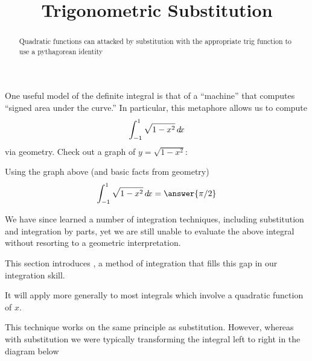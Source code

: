 \documentclass{ximera}
\title[Dig-In:]{Trigonometric Substitution}
\begin{document}
\begin{abstract}
	Quadratic functions can attacked by substitution with the appropriate trig function to use a pythagorean identity
\end{abstract}
\maketitle



One useful model of the definite integral is that of a ``machine''
that computes ``signed area under the curve.'' In particular, this
metaphore allows us to compute
\[
\int_{-1}^1 \sqrt{1-x^2} \mathop{}\!d\! x
\]
via geometry. Check out a graph of $y= \sqrt{1-x^2}$:
\begin{image}
\end{image}

\begin{question}
  Using the graph above (and basic facts from geometry)
  \[
  \int_{-1}^1 \sqrt{1-x^2} \d x = \answer{\pi/2}
  \]
\end{question}

We have since learned a number of integration techniques, including
substitution and integration by parts, yet we are still unable to
evaluate the above integral without resorting to a geometric
interpretation.

This section introduces , a method of
integration that fills this gap in our integration skill.

It will apply more generally to most integrals which involve a quadratic function of $x$.

This technique works on the same principle as substitution. However,
whereas with substitution we were typically transforming the integral
left to right in the diagram below
\end{document}
